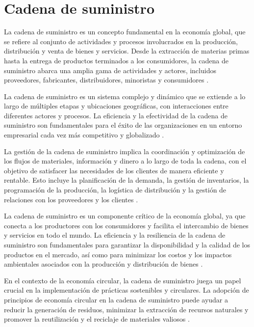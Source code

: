 \documentclass[main.tex]{subfiles}
\begin{document}
\section{Cadena de suministro}

La cadena de suministro es un concepto fundamental en la economía global, que se refiere al conjunto de actividades y procesos involucrados en la producción, distribución y venta de bienes y servicios. Desde la extracción de materias primas hasta la entrega de productos terminados a los consumidores, la cadena de suministro abarca una amplia gama de actividades y actores, incluidos proveedores, fabricantes, distribuidores, minoristas y consumidores \cite{christopher2016logistics}.

La cadena de suministro es un sistema complejo y dinámico que se extiende a lo largo de múltiples etapas y ubicaciones geográficas, con interacciones entre diferentes actores y procesos. La eficiencia y la efectividad de la cadena de suministro son fundamentales para el éxito de las organizaciones en un entorno empresarial cada vez más competitivo y globalizado \cite{christopher2016logistics}.

La gestión de la cadena de suministro implica la coordinación y optimización de los flujos de materiales, información y dinero a lo largo de toda la cadena, con el objetivo de satisfacer las necesidades de los clientes de manera eficiente y rentable. Esto incluye la planificación de la demanda, la gestión de inventarios, la programación de la producción, la logística de distribución y la gestión de relaciones con los proveedores y los clientes \cite{christopher2016logistics}.

La cadena de suministro es un componente crítico de la economía global, ya que conecta a los productores con los consumidores y facilita el intercambio de bienes y servicios en todo el mundo. La eficiencia y la resiliencia de la cadena de suministro son fundamentales para garantizar la disponibilidad y la calidad de los productos en el mercado, así como para minimizar los costos y los impactos ambientales asociados con la producción y distribución de bienes \cite{christopher2016logistics}.

En el contexto de la economía circular, la cadena de suministro juega un papel crucial en la implementación de prácticas sostenibles y circulares. La adopción de principios de economía circular en la cadena de suministro puede ayudar a reducir la generación de residuos, minimizar la extracción de recursos naturales y promover la reutilización y el reciclaje de materiales valiosos \cite{melendez2021economia}.
\end{document}
